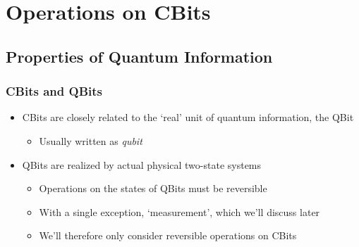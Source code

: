 \documentclass{beamer}
\begin{document}
  \section{Operations on CBits}
  \subsection{Properties of Quantum Information}
  \begin{frame} 
    \frametitle{CBits and QBits}
    \begin{itemize}
      \item{CBits are closely related to the `real' unit of quantum information, the QBit}
      \begin{itemize}
        \item{Usually written as \textit{qubit}}
      \end{itemize}
      \item{QBits are realized by actual physical two-state systems}
      \begin{itemize}
        \item{Operations on the states of QBits must be reversible}
        \item{With a single exception, `measurement', which we'll discuss later}
        \item{We'll therefore only consider reversible operations on CBits}
      \end{itemize}
    \end{itemize}
  \end{frame}

\end{document}
